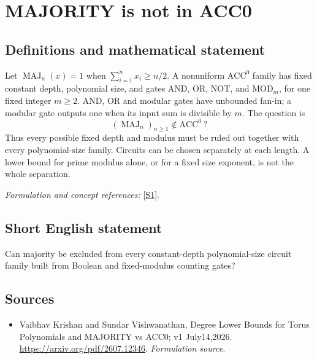 \documentclass[11pt]{article}
\begin{document}
\section*{\texorpdfstring{MAJORITY is not in ACC0}{MAJORITY is not in ACC0}}\label{30006823}
\subsection{Definitions and mathematical statement}
Let $\operatorname{MAJ}_n(x)=1$ when $\sum_{i=1}^n x_i\ge n/2$. A nonuniform $\mathrm{ACC}^0$ family has fixed constant depth, polynomial size, and gates AND, OR, NOT, and $\mathrm{MOD}_m$, for one fixed integer $m\ge2$. AND, OR and modular gates have unbounded fan-in; a modular gate outputs one when its input sum is divisible by $m$. The question is
\[
 (\operatorname{MAJ}_n)_{n\ge1}\notin\mathrm{ACC}^0\ ?
\]
Thus every possible fixed depth and modulus must be ruled out together with every polynomial-size family. Circuits can be chosen separately at each length. A lower bound for prime modulus alone, or for a fixed size exponent, is not the whole separation.
\par\smallskip\textit{Formulation and concept references:} \href{https://arxiv.org/pdf/2607.12346}{[S1]}.

\subsection{Short English statement}
Can majority be excluded from every constant-depth polynomial-size circuit family built from Boolean and fixed-modulus counting gates?
\subsection{Sources}
\begin{itemize}
\item[S1]Vaibhav Krishan and Sundar Vishwanathan, Degree Lower Bounds for Torus Polynomials and MAJORITY vs ACC0; v1 July14,2026.
\url{https://arxiv.org/pdf/2607.12346}.
\textit{Formulation source.}
\end{itemize}
\end{document}

